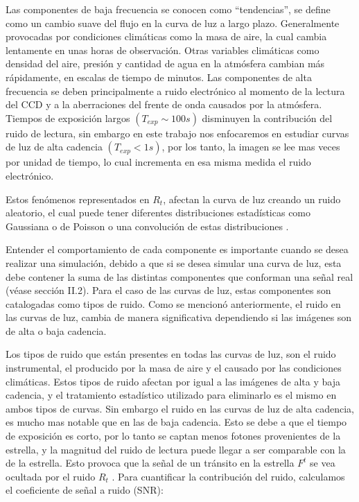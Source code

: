 Las componentes de baja frecuencia se conocen como ``tendencias'', se define como un cambio suave del flujo en la curva de luz a largo plazo. Generalmente provocadas por condiciones climáticas como la masa de aire, la cual cambia lentamente en unas horas de observación. Otras variables climáticas como densidad del aire, presión y cantidad de agua en la atmósfera cambian más rápidamente, en escalas de tiempo de minutos. Las componentes de alta frecuencia se deben principalmente a ruido electrónico al momento de la lectura del CCD y a la aberraciones del frente de onda causados por la atm\'osfera. Tiempos de exposición largos $(T_{exp} \sim 100 s)$ disminuyen la contribución del ruido de lectura, sin embargo en este trabajo nos enfocaremos en estudiar curvas de luz de alta cadencia $(T_{exp} < 1 s)$, por los tanto, la imagen se lee mas veces por unidad de tiempo, lo cual incrementa en esa misma medida el ruido electr\'onico.

Estos fenómenos representados en $R_{t}$, afectan la curva de luz creando un ruido aleatorio, el cual puede tener diferentes distribuciones estadísticas como Gaussiana o de Poisson o una convolución de estas distribuciones \cite{luisier2010image}.

Entender el comportamiento de cada componente es importante cuando se desea realizar una simulación, debido a que si se desea simular una curva de luz, esta debe contener la suma de las distintas componentes que conforman una señal real (véase sección II.2). Para el caso de las curvas de luz, estas componentes son catalogadas como tipos de ruido. Como se mencionó anteriormente, el ruido en las curvas de luz, cambia de manera significativa dependiendo si las imágenes son de alta o baja cadencia.

Los tipos de ruido que están presentes en todas las curvas de luz, son el ruido instrumental, el producido por la masa de aire y el causado por las condiciones climáticas. Estos tipos de ruido afectan por igual a las imágenes de alta y baja cadencia, y el tratamiento estadístico utilizado para eliminarlo es el mismo en ambos tipos de curvas. Sin embargo el ruido en las curvas de luz de alta cadencia, es mucho mas notable que en las de baja cadencia. Esto se debe a que el tiempo de exposición es corto, por lo tanto se captan menos fotones provenientes de la estrella, y la magnitud del ruido de lectura puede llegar a ser comparable con la de la estrella. Esto provoca que la señal de un tránsito en la estrella $F^{t}$  se vea ocultada por el ruido $R_{t}$ \cite{pont2006effect}. Para cuantificar la contribución del ruido, calculamos el coeficiente de señal a ruido (SNR):

